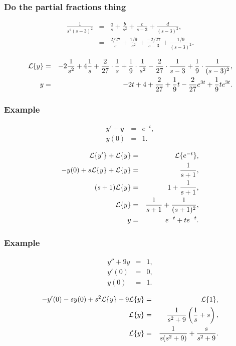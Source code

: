 \begin{frame}
  \frametitle{Do the partial fractions thing}

  \begin{eqnarray*}
    \frac{1}{s^2(s-3)^2} & = & \frac{a}{s} + \frac{b}{s^2} + \frac{c}{s-3} + \frac{d}{(s-3)^2}, \\
    & = & \frac{2/27}{s} + \frac{1/9}{s^2} + \frac{-2/27}{s-3} + \frac{1/9}{(s-3)^2}.
  \end{eqnarray*}

  {
    \begin{eqnarray*}
      \laplace{y} & = & -2 \frac{1}{s^2} + 4 \frac{1}{s} +
      \frac{2}{27}\cdot\frac{1}{s} + \frac{1}{9}\cdot\frac{1}{s^2} - \frac{2}{27}\cdot\frac{1}{s-3} +
      \frac{1}{9}\cdot\frac{1}{(s-3)^2}, \\
      y & = & -2t + 4 + \frac{2}{27}  + \frac{1}{9} t - \frac{2}{27}e^{3t} + \frac{1}{9} t e^{3t}.
    \end{eqnarray*}
  }

\end{frame}


\begin{frame}
  \frametitle{Example}

  \begin{eqnarray*}
    y' + y & = & e^{-t}, \\
    y(0) & = & 1.
  \end{eqnarray*}

  {
    \begin{eqnarray*}
      \laplace{y'} + \laplace{y} & = & \laplace{e^{-t}}, \\
        -y(0) + s \laplace{y} + \laplace{y} & = & \frac{1}{s+1}, \\
        (s+1) \laplace{y} & = & 1 + \frac{1}{s+1}, \\
        \laplace{y} & = & \frac{1}{s+1} + \frac{1}{(s+1)^2}, \\
        y & = & e^{-t} + t e^{-t}.
    \end{eqnarray*}
  }

\end{frame}


\begin{frame}
  \frametitle{Example}

  \begin{eqnarray*}
    y''  + 9y & = & 1, \\
    y'(0) & = & 0, \\
    y(0) & = & 1.
  \end{eqnarray*}

  {
    \begin{eqnarray*}
      -y'(0) - s y(0) + s^2 \laplace{y} + 9 \laplace{y} & = & \laplace{1}, \\
      \laplace{y} & = & \frac{1}{s^2+9} \lp \frac{1}{s} + s \rp, \\
      \laplace{y} & = & \frac{1}{s(s^2+9)} + \frac{s}{s^2+9}.
    \end{eqnarray*}
  }


\end{frame}



